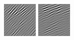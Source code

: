 \begin{figure}
\begin{center}
  \includegraphics[width=\columnwidth/9]{ch4/figures/imag_0_2.jpg}
  \includegraphics[width=\columnwidth/9]{ch4/figures/imag_0_3.jpg}

\end{center}
\end{figure}

